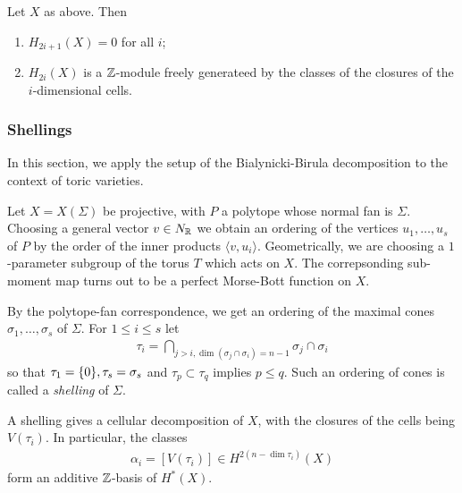\begin{cor}
    Let $X$ as above. Then \begin{enumerate}
        \item $H_{2i+1}(X) = 0$ for all $i$;
        \item $H_{2i}(X)$ is a $\mathbb{Z}$-module freely generateed by the classes
        of the closures of the $i$-dimensional cells.
    \end{enumerate}
\end{cor}

\subsubsection{Shellings}
In this section, we apply the setup 
of the Bialynicki-Birula decomposition to the context of toric varieties.

\hfill

Let $X = X(\Sigma)$ be projective, with $P$ 
a polytope whose normal fan is $\Sigma$. Choosing
a general vector $v\in N_{\mathbb{R}}$ we obtain an ordering of the vertices 
$u_1,\ldots,u_s$ of $P$ by the order of the inner products $\langle v,u_i\rangle$.
Geometrically, we are choosing a $1$-parameter subgroup of the torus $T$ 
which acts on $X$. The correpsonding sub-moment map turns out to be
a perfect Morse-Bott function on $X$.

\hfill

By the polytope-fan correspondence,
we get an ordering of the maximal cones $\sigma_1,\ldots,\sigma_s$ of $\Sigma$.
For $1\leq i \leq s$ let \begin{align*}
    \tau_i = \bigcap_{j>i, \dim(\sigma_j \cap \sigma_i) = n-1} \sigma_j \cap \sigma_i
\end{align*} so that 
$\tau_1 = \{0\}, \tau_s = \sigma_s$ and $\tau_p \subset \tau_q$
implies $p \leq q$. Such an ordering of cones 
is called a \emph{shelling} of $\Sigma$. 

\begin{proposition}
    A shelling gives a cellular decomposition of $X$, with
the closures of the cells being $V(\tau_i)$. In particular,
the classes \begin{align*}
    \alpha_i = [V(\tau_i)] \in H^{2(n-\dim \tau_i)}(X)
\end{align*}
form an additive $\mathbb{Z}$-basis of $H^*(X)$.
\end{proposition}


